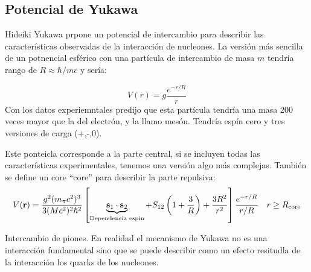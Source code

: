 \subsection{Potencial de Yukawa}

Hideiki Yukawa prpone un potencial de intercambio para describir las características observadas de la interacción de nucleones. La versión más sencilla de un potnencial esférico con una partícula de intercambio de masa $m$ tendría rango de $R \approx \hbar /mc$ y sería:

\begin{equation}
    V(r) = g \frac{e^{-r/R}}{r}
\end{equation}
Con los datos experiemntales predijo que esta partícula tendría una masa 200 veces mayor que la del electrón, y la llamo mesón. Tendría espín cero y tres versiones de carga (+,-,0).  

Este ponteicla corresponde a la parte central, si se incluyen todas las características experimentales, tenemos una versión algo más complejas. También se define un core ``core'' para describir la parte repulsiva:
\begin{equation}
    V(\mathbf{r}) = \frac{g^2 (m_\pi c^2)^3}{3(Mc^2)^2 \hbar^2}  \left[  \underbrace{\mathbf{s}_1 \cdot \mathbf{s}_2}_{\text{Dependencia espin}} + S_{12}\left( 1+\frac{3}{R} \right) + \frac{3R^2}{r^2} \right] \frac{e^{-r/R}}{r/R} \quad r \geq R_{\text{core}}
\end{equation}

Intercambio de piones. En realidad el mecanismo de Yukawa no es una interacción fundamental sino que se puede describir como un efecto resitudla de la interacción los quarks de los nucleones.

